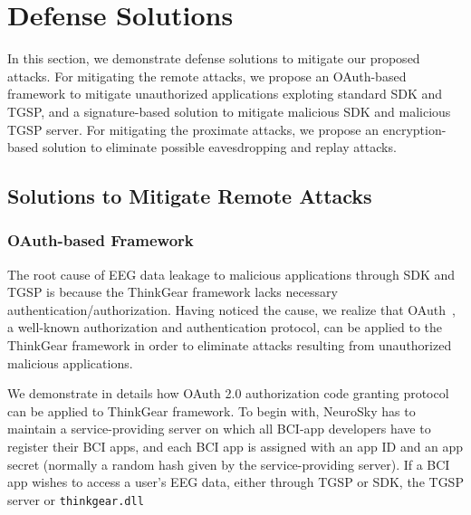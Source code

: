\section{Defense Solutions}
\label{sec:defense}

In this section, we demonstrate defense solutions to mitigate our proposed attacks. For mitigating the remote attacks, we propose an OAuth-based framework to mitigate unauthorized applications exploting standard SDK and TGSP, and a signature-based solution to mitigate malicious SDK and malicious TGSP server. For mitigating the proximate attacks, we propose an encryption-based solution to eliminate possible eavesdropping and replay attacks.

\subsection{Solutions to Mitigate Remote Attacks}

\subsubsection{OAuth-based Framework}
The root cause of EEG data leakage to malicious applications through SDK and TGSP is because the ThinkGear framework lacks necessary authentication/authorization. Having noticed the cause, we realize that OAuth~\cite{hardt2012oauth}, a well-known authorization and authentication protocol, can be applied to the ThinkGear framework in order to eliminate attacks resulting from unauthorized malicious applications.

We demonstrate in details how OAuth 2.0 authorization code granting protocol can be applied to ThinkGear framework. To begin with, NeuroSky has to maintain a service-providing server on which all BCI-app developers have to register their BCI apps, and each BCI app is assigned with an app ID and an app secret (normally a random hash given by the service-providing server). If a BCI app wishes to access a user's EEG data, either through TGSP or SDK, the TGSP server or \texttt{thinkgear.dll}

